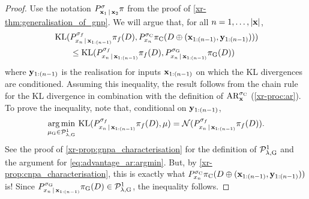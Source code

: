 \documentclass[12pt, twoside]{report}
\newcommand{\xrprefix}[1]{xr-#1}
\begin{document}
\begin{proof}
    Use the notation $P_{\mathbf{x}_1 \,|\, \mathbf{x}_2}^\sigma \pi$ from the proof of \cref{\xrprefix{thm:generalisation_of_gnp}}.
    We will argue that, for all $n = 1, \ldots, \lvert\mathbf{x}\rvert$,
    \begin{align}
        &\KL(
            P_{x_n \cond \vx_{1:(n-1)}}^{\sigma_f} \pi_f(D),
            P_{x_n}^{\sigma\ss{C}} \pi\ss{C}(D \oplus (\vx_{1:(n-1)}, \vy_{1:(n - 1)}))
        ) \nonumber \\
        &\qquad\le \KL(
            P_{x_n \cond \vx_{1:(n-1)}}^{\sigma_f} \pi_f(D),
            P_{x_n \cond \vx_{1:(n-1)}}^{\sigma\ss{G}} \pi\ss{G}(D)
        )
    \end{align}
    where $\mathbf{y}_{1:(n-1)}$ is the realisation for inputs $\mathbf{x}_{1:(n-1)}$ on which the KL divergences are conditioned.
    Assuming this inequality, the result follows from the chain rule for the KL divergence in combination with the definition of $\AR_\vx^{\sigma\ss{C}}$ (\cref{\xrprefix{proc:ar}}).
    To prove the inequality, note that,
    conditional on $\mathbf{y}_{1:(n-1)}$,%
    \begin{equation} \label{eq:advantage_ar:argmin}
        \argmin_{\mu\ss{G} \in \Pc\ss{$\lambda$,G}^1}\,
        \KL(
            P_{x_n \cond \vx_{1:(n-1)}}^{\sigma_f} \pi_f(D),
            \mu
        )
        = \Normal(P_{x_n \cond \vx_{1:(n-1)}}^{\sigma_f} \pi_f(D)).
    \end{equation}
    See the proof of \cref{\xrprefix{prop:gnpa_characterisation}} for the definition of $\Pc\ss{$\lambda$,G}^1$ and the argument for \eqref{eq:advantage_ar:argmin}.
    But, by \cref{\xrprefix{prop:cnpa_characterisation}}, this is exactly what 
    $P_{x_n}^{\sigma\ss{C}} \pi\ss{C}(D \oplus (\vx_{1:(n-1)}, \vy_{1:(n - 1)}))$
    is!
    Since $P_{x_n \cond \vx_{1:(n-1)}}^{\sigma\ss{G}} \pi\ss{G}(D) \in \Pc\ss{$\lambda$,G}^1$, the inequality follows.
\end{proof}
\end{document}
